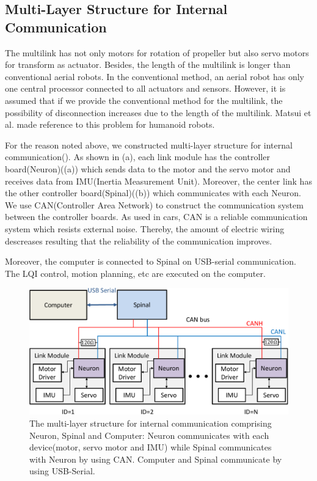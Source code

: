 \subsection{Multi-Layer Structure for Internal Communication}
The multilink has not only motors for rotation of propeller but also servo motors for transform as actuator. Besides, the length of the multilink is longer than conventional aerial robots. In the conventional method, an aerial robot has only one central processor connected to all actuators and sensors. However, it is assumed that if we provide the conventional method for the multilink, the possibility of disconnection increases due to the length of the multilink. Matsui et al.\cite{Matsui2005} made reference to this problem for humanoid robots.
\par
For the reason noted above, we constructed multi-layer structure for internal communication(). As shown in (a), each link module has the controller board(Neuron)((a)) which sends data to the motor and the servo motor and receives data from IMU(Inertia Measurement Unit). Moreover, the center link has the other controller board(Spinal)((b)) which communicates with each Neuron. We use CAN(Controller Area Network)\cite{CAN} to construct the communication system between the controller boards. As used in cars, CAN is a reliable communication system which resists external noise. Thereby, the amount of electric wiring descreases resulting that the reliability of the communication improves. 
\par
Moreover, the computer is connected to Spinal on USB-serial communication. The LQI control, motion planning, etc are executed on the computer.
\begin{figure}[t]
  \begin{center}
    \includegraphics[width=1.0\columnwidth]{figs/internal_communication.pdf}
  \end{center}
  \caption{The multi-layer structure for internal communication comprising Neuron, Spinal and Computer: Neuron communicates with each device(motor, servo motor and IMU) while Spinal communicates with Neuron by using CAN. Computer and Spinal communicate by using USB-Serial.\label{figure:internal_communication}}
\end{figure}
